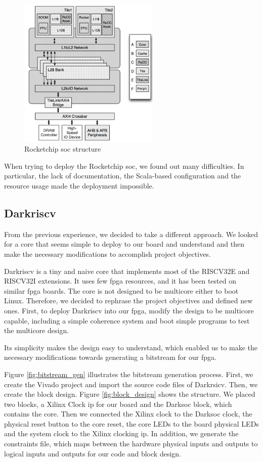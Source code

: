 \begin{figure}[h]
  \centering
  \includegraphics[width=0.6\textwidth]{images/rocket_structure.png}
  \caption{Rocketchip \gls{soc} structure}
  \label{fig:rocketstruct}
\end{figure}

When trying to deploy the Rocketchip \gls{soc}, we found out many difficulties. In particular, the lack of documentation, the Scala-based configuration and the resource usage made the deployment impossible.

\subsection{Darkriscv}
From the previous experience, we decided to take a different approach. We looked for a core that seems simple to deploy to our board and understand and then make the necessary modifications to accomplish project objectives.

Darkriscv\cite{darkriscv} is a tiny and naive core that implements most of the RISCV32E and RISCV32I extensions. It uses few \gls{fpga} resources, and it has been tested on similar \gls{fpga} boards. The core is not designed to be multicore either to boot Linux. Therefore, we decided to rephrase the project objectives and defined new ones. First, to deploy Darkriscv into our \gls{fpga}, modify the design to be multicore capable, including a simple coherence system and boot simple programs to test the multicore design.

Its simplicity makes the design easy to understand, which enabled us to make the necessary modifications towards generating a bitstream for our \gls{fpga}.

Figure \ref{fig:bitstream_gen} illustrates the bitstream generation process. 
First, we create the Vivado project and import the source code files of Darkrsicv.  Then, we create the block design. Figure \ref{fig:block_design} shows the structure. We placed two blocks, a Xilinx Clock \gls{ip} for our board and the Darksoc block, which contains the core. Then we connected the Xilinx clock to the Darksoc clock, the physical reset button to the core reset, the core LEDs to the board physical LEDs and the system clock to the Xilinx clocking \gls{ip}. In addition, we generate the constraints file, which maps between the hardware physical inputs and outputs to logical inputs and outputs for our code and block design.

